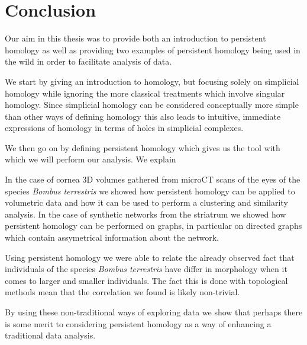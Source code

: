 \clearpage
\chapter{Conclusion}
Our aim in this thesis was to provide both an introduction to persistent homology as well as providing two examples of persistent homology being used in the wild in order to facilitate analysis of data.

We start by giving an introduction to homology, but focusing solely on simplicial homology while ignoring the more classical treatments which involve singular homology. Since simplicial homology can be considered conceptually more simple than other ways of defining homology this also leads to intuitive, immediate expressions of homology in terms of holes in simplicial complexes.

We then go on by defining persistent homology which gives us the tool with which we will perform our analysis. We explain

In the case of cornea 3D volumes gathered from microCT scans of the eyes of the species \textit{Bombus terrestris} we showed how persistent homology can be applied to volumetric data and how it can be used to perform a clustering and similarity analysis. In the case of synthetic networks from the striatrum we showed how persistent homology can be performed on graphs, in particular on directed graphs which contain assymetrical information about the network.

Using persistent homology we were able to relate the already observed fact that individuals of the species \textit{Bombus terrestris} have differ in morphology when it comes to larger and smaller individuals. The fact this is done with topological methods mean that the correlation we found is likely non-trivial.

By using these non-traditional ways of exploring data we show that perhaps there is some merit to considering persistent homology as a way of enhancing a traditional data analysis.
